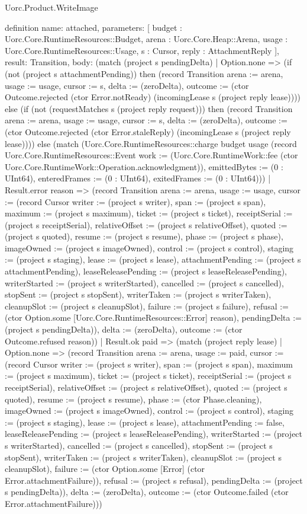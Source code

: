 \begin{lexlean}{Uorc.Product.WriteImage}
\begin{semanticmodule}
definition{
  name: attached,
  parameters: [
    budget : Uorc.Core.RuntimeResources::Budget,
    arena : Uorc.Core.Heap::Arena,
    usage : Uorc.Core.RuntimeResources::Usage,
    s : Cursor,
    reply : AttachmentReply
  ],
  result: Transition,
  body: (match (project s pendingDelta)
    | Option.none => (if (not (project s attachmentPending)) then (record Transition {arena := arena, usage := usage, cursor := s, delta := (zeroDelta), outcome := (ctor Outcome.rejected (ctor Error.notReady) (incomingLease s (project reply lease)))}) else (if (not (requestMatches s (project reply request))) then (record Transition {arena := arena, usage := usage, cursor := s, delta := (zeroDelta), outcome := (ctor Outcome.rejected (ctor Error.staleReply) (incomingLease s (project reply lease)))}) else (match (Uorc.Core.RuntimeResources::charge budget usage (record Uorc.Core.RuntimeResources::Event {work := (Uorc.Core.RuntimeWork::fee (ctor Uorc.Core.RuntimeWork::Operation.acknowledgment)), emittedBytes := (0 : UInt64), enteredFrames := (0 : UInt64), exitedFrames := (0 : UInt64)}))
      | Result.error reason => (record Transition {arena := arena, usage := usage, cursor := (record Cursor {writer := (project s writer), span := (project s span), maximum := (project s maximum), ticket := (project s ticket), receiptSerial := (project s receiptSerial), relativeOffset := (project s relativeOffset), quoted := (project s quoted), resume := (project s resume), phase := (project s phase), imageOwned := (project s imageOwned), control := (project s control), staging := (project s staging), lease := (project s lease), attachmentPending := (project s attachmentPending), leaseReleasePending := (project s leaseReleasePending), writerStarted := (project s writerStarted), cancelled := (project s cancelled), stopSent := (project s stopSent), writerTaken := (project s writerTaken), cleanupSlot := (project s cleanupSlot), failure := (project s failure), refusal := (ctor Option.some [Uorc.Core.RuntimeResources::Error] reason), pendingDelta := (project s pendingDelta)}), delta := (zeroDelta), outcome := (ctor Outcome.refused reason)})
      | Result.ok paid => (match (project reply lease)
        | Option.none => (record Transition {arena := arena, usage := paid, cursor := (record Cursor {writer := (project s writer), span := (project s span), maximum := (project s maximum), ticket := (project s ticket), receiptSerial := (project s receiptSerial), relativeOffset := (project s relativeOffset), quoted := (project s quoted), resume := (project s resume), phase := (ctor Phase.cleaning), imageOwned := (project s imageOwned), control := (project s control), staging := (project s staging), lease := (project s lease), attachmentPending := false, leaseReleasePending := (project s leaseReleasePending), writerStarted := (project s writerStarted), cancelled := (project s cancelled), stopSent := (project s stopSent), writerTaken := (project s writerTaken), cleanupSlot := (project s cleanupSlot), failure := (ctor Option.some [Error] (ctor Error.attachmentFailure)), refusal := (project s refusal), pendingDelta := (project s pendingDelta)}), delta := (zeroDelta), outcome := (ctor Outcome.failed (ctor Error.attachmentFailure))})
}
\end{semanticmodule}
\end{lexlean}

